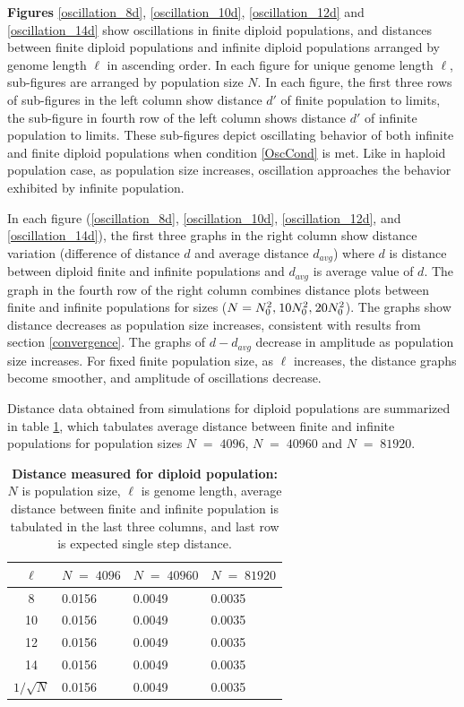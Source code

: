 
\clearpage

\textbf{ Figures} \ref{oscillation_8d}, \ref{oscillation_10d}, \ref{oscillation_12d} 
and \ref{oscillation_14d} show oscillations in finite diploid populations, and distances 
between finite diploid populations and infinite diploid populations arranged by genome length $\ell$ in ascending order. 
In each figure for unique genome length $\ell$, sub-figures 
are arranged by population size $N$. In each figure, the first three rows of sub-figures in the left column show distance $d'$ of finite population 
to limits, the sub-figure in fourth row of the left column shows distance $d'$ of infinite population to limits. These sub-figures depict 
oscillating behavior of both infinite and finite diploid populations when condition \ref{OscCond} is met. 
Like in haploid population case, as population size increases, oscillation approaches the behavior exhibited by infinite population. 

In each figure (\ref{oscillation_8d}, \ref{oscillation_10d}, \ref{oscillation_12d}, 
and \ref{oscillation_14d}), the first three graphs in the right column show 
distance variation (difference of distance $d$ and average distance $d_{avg}$)  
where $d$ is distance between diploid finite and infinite populations and $d_{avg}$ is average value of $d$. 
The graph in the fourth row of the right column combines distance plots between finite and infinite populations for sizes 
($N = N_0^2, \hspace{0.01in}10N_0^2, \hspace{0.01in}20N_0^2$). The graphs show distance decreases 
as population size increases, consistent with results from section \ref{convergence}. 
The graphs of $d-d_{avg}$ decrease in amplitude as population size increases. 
For fixed finite population size, as $\ell$ increases, the distance graphs become smoother, and amplitude of oscillations decrease.

Distance data obtained from simulations for diploid populations are summarized in table \ref{tableDistanceOscDip}, 
which tabulates average distance between finite and infinite populations 
for population sizes $N \;=\; 4096 $, $N \;=\; 40960 $ and $N \;=\; 81920 $.
%
\begin{table}[h]
\caption{\textbf{Distance measured for diploid population:} $N$ is population size, $\ell$ is genome length, 
average distance between finite and infinite population is tabulated in the last three columns, and last row is expected single step distance.}
\centering
\begin{tabularx}{0.75\textwidth}{ c *{3}{X}}
\toprule
$\ell$ & $N \;=\; 4096 $ & $N \;=\; 40960 $ & $N \;=\; 81920 $\\
\midrule
8 & 0.0156 & 0.0049 & 0.0035 \\
10 & 0.0156 & 0.0049 & 0.0035 \\
12 & 0.0156 & 0.0049 & 0.0035 \\
14 & 0.0156 & 0.0049 & 0.0035 \\
\midrule
$1/\sqrt{N}$ & 0.0156 & 0.0049 & 0.0035 \\
\bottomrule

\end{tabularx}
\label{tableDistanceOscDip}
\end{table}


